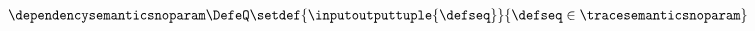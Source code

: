 
\begin{gather*}
  \dependencysemanticsnoparam \DefeQ \setdef{\inputoutputtuple{\defseq}}{\defseq\in\tracesemanticsnoparam}
\end{gather*}
